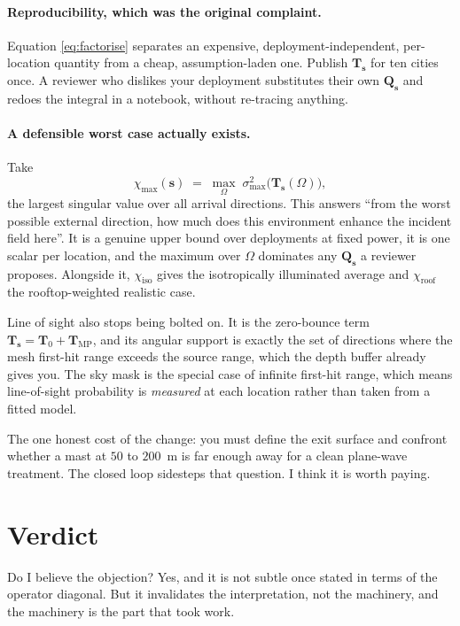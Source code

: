 \documentclass[11pt,a4paper]{article}
\newcommand{\bs}{\mathbf{s}}
\newcommand{\bT}{\mathbf{T}}
\begin{document}
\paragraph{Reproducibility, which was the original complaint.} Equation
\eqref{eq:factorise} separates an expensive, deployment-independent, per-location
quantity from a cheap, assumption-laden one. Publish $\bT_{\bs}$ for ten cities
once. A reviewer who dislikes your deployment substitutes their own
$\mathbf{Q}_{\bs}$ and redoes the integral in a notebook, without re-tracing
anything.

\paragraph{A defensible worst case actually exists.} Take
\begin{equation}
  \chi_{\max}(\bs) \;=\; \max_{\Omega}\;
  \sigma_{\max}^2\bigl(\bT_{\bs}(\Omega)\bigr),
\end{equation}
the largest singular value over all arrival directions. This answers ``from the
worst possible external direction, how much does this environment enhance the
incident field here''. It is a genuine upper bound over deployments at fixed
power, it is one scalar per location, and the maximum over $\Omega$ dominates any
$\mathbf{Q}_{\bs}$ a reviewer proposes. Alongside it, $\chi_{\text{iso}}$ gives
the isotropically illuminated average and $\chi_{\text{roof}}$ the rooftop-weighted
realistic case.

Line of sight also stops being bolted on. It is the zero-bounce term
$\bT_{\bs} = \bT_0 + \bT_{\text{MP}}$, and its angular support is exactly the set
of directions where the mesh first-hit range exceeds the source range, which the
depth buffer already gives you. The sky mask is the special case of infinite
first-hit range, which means line-of-sight probability is \emph{measured} at each
location rather than taken from a fitted model.

The one honest cost of the change: you must define the exit surface and confront
whether a mast at $50$ to $200$~m is far enough away for a clean plane-wave
treatment. The closed loop sidesteps that question. I think it is worth paying.

\section{Verdict}

Do I believe the objection? Yes, and it is not subtle once stated in terms of the
operator diagonal. But it invalidates the interpretation, not the machinery, and
the machinery is the part that took work.
\end{document}
